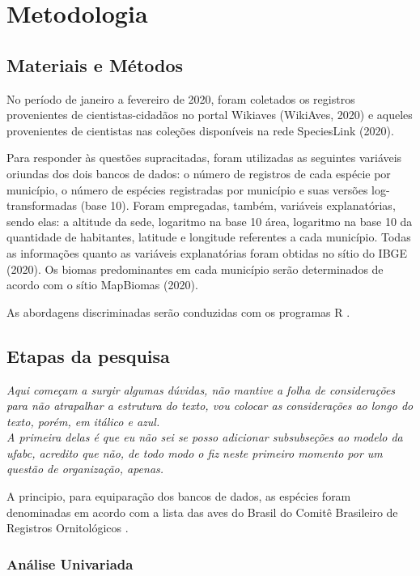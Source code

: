 \section{Metodologia}

\subsection{Materiais e Métodos}

No período de janeiro a fevereiro de 2020, foram coletados os registros provenientes de cientistas-cidadãos no portal Wikiaves (WikiAves, 2020) e aqueles provenientes de cientistas nas coleções disponíveis na rede SpeciesLink (2020).

Para responder às questões supracitadas, foram utilizadas as seguintes variáveis oriundas dos dois bancos de dados: o número de registros de cada espécie por município, o número de espécies registradas por município e suas versões log-transformadas (base 10). Foram empregadas, também, variáveis explanatórias, sendo elas: a altitude da sede, logaritmo na base 10 área, logaritmo na base 10 da quantidade de habitantes, latitude e longitude referentes a cada município. Todas as informações quanto as variáveis explanatórias foram obtidas no sítio do IBGE (2020). Os biomas predominantes em cada município serão determinados de acordo com o sítio MapBiomas (2020).

 As abordagens discriminadas serão conduzidas com os programas R \cite{CoreTeam2017}.

\subsection{Etapas da pesquisa}

\color{blue}\textit{Aqui começam a surgir algumas dúvidas, não mantive a folha de considerações para não atrapalhar a estrutura do texto, vou colocar as considerações ao longo do texto, porém, em itálico e azul.\\ A primeira delas é que eu não sei se posso adicionar subsubseções ao modelo da ufabc, acredito que não, de todo modo o fiz neste primeiro momento por um questão de organização, apenas.}\color{black}

A principio, para equiparação dos bancos de dados, as espécies foram denominadas em acordo com a lista das aves do Brasil do Comitê Brasileiro de Registros Ornitológicos \cite{De2015}.

\subsubsection{Análise Univariada}

